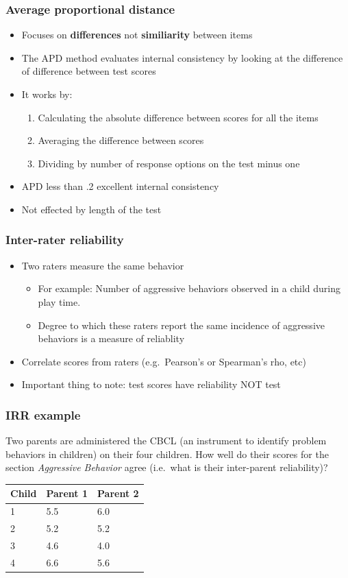 \documentclass[dvipsnames]{beamer}\usepackage[]{graphicx}\usepackage[]{color}
\begin{document}
\begin{frame}
\frametitle{Average proportional distance}
\begin{itemize}
  \item Focuses on \textbf{differences} not \textbf{similiarity} between items
  \item The APD method evaluates internal consistency by looking at the difference of difference between test scores
  \item It works by:
    \begin{enumerate}
      \item Calculating the absolute difference between scores for all the items
      \item Averaging the difference between scores
      \item Dividing by number of response options on the test minus one
    \end{enumerate}
    \item APD less than .2 excellent internal consistency
    \item Not effected by length of the test
\end{itemize}
\end{frame}

\begin{frame}
\frametitle{Inter-rater reliability}
\begin{itemize}
\item Two raters measure the same behavior
  \begin{itemize}
  \item For example: Number of aggressive behaviors observed in a child during play time.
  \item Degree to which these raters report the same incidence of aggressive behaviors is a measure of reliablity
  \end{itemize}
\item Correlate scores from raters (e.g.\ Pearson's or Spearman's rho, etc)
\item Important thing to note: test scores have reliability NOT test
\end{itemize}
\end{frame}

\begin{frame}
\frametitle{IRR example}

Two parents are administered the CBCL (an instrument to identify problem behaviors in children) on their four children. How well do their scores for the section \textit{Aggressive Behavior} agree (i.e.\ what is their inter-parent reliability)?

\begin{center}
\begin{tabular}{lll}
\hline
Child &	Parent 1 &	Parent 2 \\
\hline
1&	5.5	&6.0\\
2&	5.2	&5.2\\
3&	4.6&	4.0\\
4&	6.6&	5.6\\
\hline
\end{tabular}
\end{center}
\end{frame}
\end{document}
